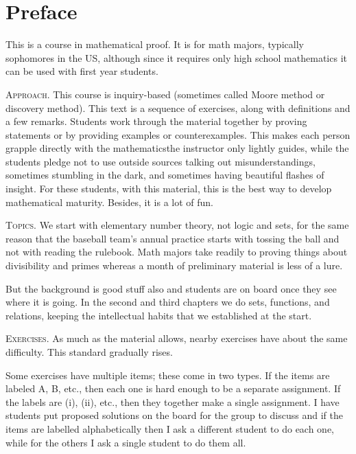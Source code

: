 \chapter*{Preface}

This is a course in mathematical proof. 
It is for math majors, typically sophomores in the US, although since
it requires only high school mathematics
it can be used with first year students.



\medskip
\noindent\textsc{Approach.}
This course is inquiry-based (sometimes called Moore method 
or discovery method).
This text is a sequence of exercises,
along with definitions and a few remarks.
Students work through the material together by
proving statements or by providing examples or counterexamples.
This makes each person grapple directly with the 
mathematics\Dash the instructor only 
lightly guides, while the students pledge not to use outside sources\Dash
talking out misunderstandings, 
sometimes stumbling in the dark, and sometimes
having beautiful flashes of insight.
For these students, with this material,
this is the best way to develop mathematical maturity.
Besides, it is a lot of fun.


\medskip
\noindent\textsc{Topics.}
We start with elementary number theory, not logic and sets, 
for the same reason
that the baseball team's annual practice starts with tossing the ball and 
not with reading the rulebook.
Math majors take readily to proving things about
divisibility and primes 
whereas a month of preliminary material is less of a lure.

But the background is good stuff also and 
students are on board once they see where it is going.
In the second and third chapters we do
sets, functions, and relations, keeping the
intellectual habits that we established at the start.



\medskip
\noindent\textsc{Exercises.}
As much as the material allows,
nearby exercises have about the same difficulty.
This standard gradually rises.

Some exercises have multiple items; these come in two types.
If the items are labeled \textsc{A}, \textsc{B}, etc., 
then each one is hard enough to be a separate assignment.
If the labels are (i), (ii), etc., then they together make
a single assignment.
I have students put proposed solutions on the board
for the group to discuss and
if the items are labelled alphabetically then I ask a different student
to do each one, while for the others I ask a single student to do them all.

